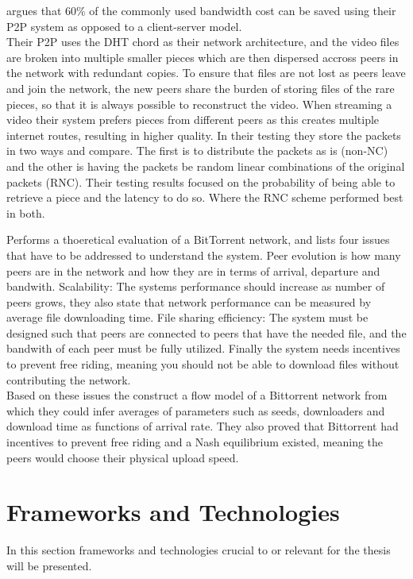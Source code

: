 \cite{nguyen2009p2p} argues that 60\% of the commonly used bandwidth cost can be saved using their \ac{P2P} system as opposed to a client-server model.\\
Their \acs{P2P} uses the \ac{DHT} chord as their network architecture, and the video files are broken into multiple smaller pieces which are then dispersed accross peers in the network with redundant copies. To ensure that files are not lost as peers leave and join the network, the new peers share the burden of storing files of the rare pieces, so that it is always possible to reconstruct the video. When streaming a video their system prefers pieces from different peers as this creates multiple internet routes, resulting in higher quality. In their testing they store the packets in two ways and compare. The first is to distribute the packets as is (non-NC) and the other is having the packets be random linear combinations of the original packets (RNC). Their testing results focused on the probability of being able to retrieve a piece and the latency to do so. Where the RNC scheme performed best in both.

\cite{qiu2004modeling} Performs a thoeretical evaluation of a BitTorrent network, and lists four issues that have to be addressed to understand the system.
Peer evolution is how many peers are in the network and how they are in terms of arrival, departure and bandwith.
Scalability: The systems performance should increase as number of peers grows, they also state that network performance can be measured by average file downloading time.
File sharing efficiency: The system must be designed such that peers are connected to peers that have the needed file, and the bandwith of each peer must be fully utilized.
Finally the system needs incentives to prevent free riding, meaning you should not be able to download files without contributing the network.\\
Based on these issues the construct a flow model of a Bittorrent network from which they could infer averages of parameters such as seeds, downloaders and download time as functions of arrival rate. They also proved that Bittorrent had incentives to prevent free riding and a Nash equilibrium existed, meaning the peers would choose their physical upload speed.

\section{Frameworks and Technologies}
\label{sec:fram-techn}
In this section frameworks and technologies crucial to or relevant for the thesis will be presented.

